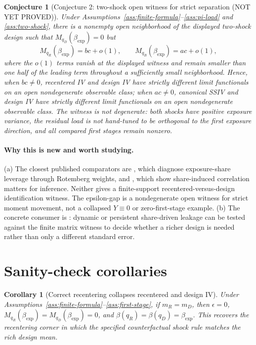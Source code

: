 \documentclass[11pt]{article}
\theoremstyle{definition}
\theoremstyle{plain}
\newtheorem{conjecture}{Conjecture}
\newtheorem{corollary}{Corollary}
\theoremstyle{remark}
\begin{document}
\begin{conjecture}[Conjecture 2: two-shock open witness for strict separation (NOT YET PROVED)]\label{conj:two-shock-witness}
Under Assumptions~\ref{ass:finite-formula}--\ref{ass:pi-load} and \ref{ass:two-shock}, there is a nonempty open neighborhood of the displayed two-shock design such that \(M_{q_D}(\beta_{\exp})=0\) but
\[
  M_{q_R}(\beta_{\exp})=bc+o(1),\qquad
  M_{q_B}(\beta_{\exp})=ac+o(1),
\]
where the \(o(1)\) terms vanish at the displayed witness and remain smaller than one half of the leading term throughout a sufficiently small neighborhood.  Hence, when \(b c\ne0\), recentered IV and design IV have strictly different limit functionals on an open nondegenerate observable class; when \(a c\ne0\), canonical SSIV and design IV have strictly different limit functionals on an open nondegenerate observable class.  The witness is not degenerate: both shocks have positive exposure variance, the residual load is not hand-tuned to be orthogonal to the first exposure direction, and all compared first stages remain nonzero.
\end{conjecture}
\paragraph{Why this is new and worth studying.}
(a) The closest published comparators are \citet{GoldsmithPinkhamSorkinSwift2020AER}, which diagnose exposure-share leverage through Rotemberg weights, and \citet{AdaoKolesarMorales2019QJE}, which show share-induced correlation matters for inference.  Neither gives a finite-support recentered-versus-design identification witness.  The epsilon-gap is a nondegenerate open witness for strict moment movement, not a collapsed \(Y\equiv0\) or zero-first-stage example.  (b) The concrete consumer is \citet{JaegerRuistStuhler2018NBER}: dynamic or persistent share-driven leakage can be tested against the finite matrix witness to decide whether a richer design is needed rather than only a different standard error.

\section{Sanity-check corollaries}
\begin{corollary}[Correct recentering collapses recentered and design IV]\label{cor:correct-recentering}
Under Assumptions~\ref{ass:finite-formula}--\ref{ass:first-stage}, if \(m_R=m_D\), then \(\epsilon=0\), \(M_{q_R}(\beta_{\exp})=M_{q_D}(\beta_{\exp})=0\), and \(\beta(q_R)=\beta(q_D)=\beta_{\exp}\).  This recovers the \citet{BorusyakHull2023Econometrica} recentering corner in which the specified counterfactual shock rule matches the rich design mean.
\end{corollary}
\end{document}
